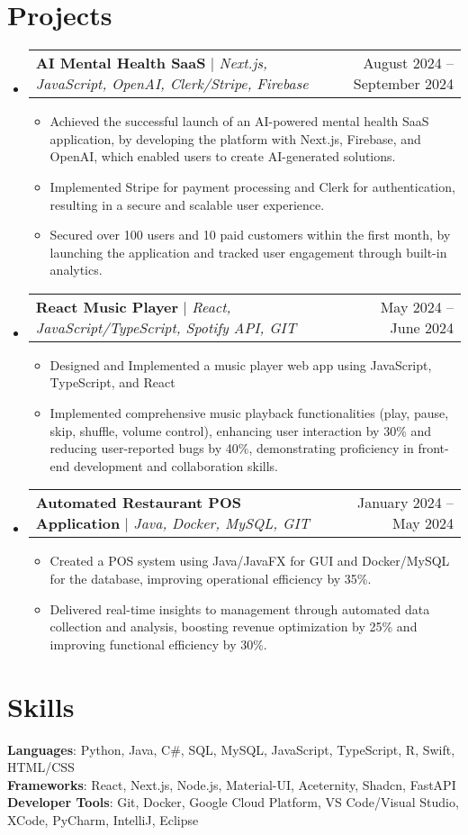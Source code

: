 \documentclass[letterpaper,11pt]{article}
\makeatletter
\newcommand{\resumeItem}[1]{
  \item\small{
    {#1 \vspace{-1pt}}
  }
}
\newcommand{\resumeProjectHeading}[2]{
    \item
    \begin{tabular*}{0.97\textwidth}{l@{\extracolsep{\fill}}r}
      \small#1 & #2 \\
    \end{tabular*}\vspace{-6pt}
}
\newcommand{\resumeSubHeadingListStart}{\begin{itemize}[leftmargin=0.15in, label={}]}
\newcommand{\resumeSubHeadingListEnd}{\end{itemize}}
\newcommand{\resumeItemListStart}{\begin{itemize}}
\newcommand{\resumeItemListEnd}{\end{itemize}\vspace{-5pt}}
\makeatother
\begin{document}
\section{Projects}
    \resumeSubHeadingListStart
      \resumeProjectHeading
          {\textbf{AI Mental Health SaaS} $|$ \emph{Next.js, JavaScript, OpenAI, Clerk/Stripe, Firebase}}{August 2024 -- September 2024}
          \resumeItemListStart
            \resumeItem{Achieved the successful launch of an AI-powered mental health SaaS application, by developing the platform with Next.js, Firebase, and OpenAI, which enabled users to create AI-generated solutions.}
            \resumeItem{Implemented Stripe for payment processing and Clerk for authentication, resulting in a secure and scalable user experience.}
            \resumeItem{Secured over 100 users and 10 paid customers within the first month, by launching the application and tracked user engagement through built-in analytics.}
          \resumeItemListEnd
      \resumeProjectHeading
          {\textbf{React Music Player} $|$ \emph{React, JavaScript/TypeScript, Spotify API, GIT}}{May 2024 -- June 2024}
          \resumeItemListStart
            \resumeItem{Designed and Implemented a music player web app using JavaScript, TypeScript, and React}
            \resumeItem{Implemented comprehensive music playback functionalities (play, pause, skip, shuffle, volume control), enhancing user interaction by 30\% and reducing user-reported bugs by 40\%, demonstrating proficiency in front-end development and collaboration skills.}
          \resumeItemListEnd
        \resumeProjectHeading
          {\textbf{Automated Restaurant POS Application} $|$ \emph{Java, Docker, MySQL, GIT}}{January 2024 -- May 2024}
          \resumeItemListStart
            \resumeItem{Created a POS system using Java/JavaFX for GUI and Docker/MySQL for the database, improving operational efficiency by 35\%.}
            \resumeItem{Delivered real-time insights to management through automated data collection and analysis, boosting revenue optimization by 25\% and improving functional efficiency by 30\%.}
          \resumeItemListEnd
    \resumeSubHeadingListEnd



%
\section{Skills}
 \begin{itemize}[leftmargin=0.15in, label={}]
    \small{\item{
     \textbf{Languages}{: Python, Java, C\#, SQL, MySQL, JavaScript, TypeScript, R, Swift, HTML/CSS} \\
     \textbf{Frameworks}{: React, Next.js, Node.js, Material-UI, Aceternity, Shadcn, FastAPI} \\
     \textbf{Developer Tools}{: Git, Docker, Google Cloud Platform, VS Code/Visual Studio, XCode, PyCharm, IntelliJ, Eclipse} \\
    }}
 \end{itemize}


\end{document}
